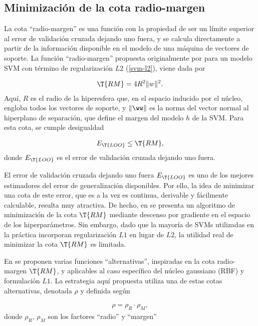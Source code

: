 
\subsection{Minimización de la cota radio-margen}
La cota ``radio-margen'' es una función con la propiedad de ser un
límite superior al error de validación cruzada dejando uno fuera, y se
calcula directamente a partir de la información disponible en el
modelo de una máquina de vectores de soporte.  La función
``radio-margen'' propuesta originalmente por \citeauthor{vapnik}
\cite{vapnik} para un modelo SVM  con término de regularización $L2$
(\autoref{svm-l2}), viene dada por %

\begin{align}
  \T{RM} = 4R^2 \|w\|^2.
\end{align}
Aquí, $R$ es el radio de la hiperesfera que, en el espacio inducido
por el núcleo, engloba todos los vectores de soporte, y $\|\ww\|$ es
la norma del vector normal al hiperplano de separación, que define el
margen del modelo $h$ de la SVM.  Para esta cota, se cumple
desigualdad

\begin{align}
  E_{\T{LOO}} \leq \T{RM},
\end{align}
donde $E_{\T{LOO}}$ es el error de validación cruzada dejando uno
fuera.

El error de validación cruzada dejando uno fuera $E_{\T{LOO}}$ es uno
de los mejores estimadores del error de generalización disponibles.
Por ello, la idea de minimizar una cota de este error, que es a la vez
es continua, derivable y fácilmente calculable, resulta muy atractiva.
De hecho, en \cite{chapelle} se presenta un algoritmo de minimización
de la cota $\T{RM}$ mediante descenso por gradiente en el espacio de
los hiperparámetros.  Sin embargo, dado que la mayoría de SVMs
utilizadas en la práctica incorporan regularización $L1$ en lugar de
$L2$, la utilidad real de minimizar la cota $\T{RM}$ es limitada.

En \cite{chung} se proponen varias funciones ``alternativas'',
inspiradas en la cota radio-margen $\T{RM}$, y aplicables al caso
específico del núcleo gaussiano (RBF) y formulación $L1$. La
estrategia aquí propuesta utiliza una de estas cotas
alternativas, denotada $\rho$ y definida según

\begin{align}
  \rho = \rho_R \cdot \rho_M,
\end{align}
donde $\rho_R$, $\rho_M$ son los factores ``radio'' y ``margen''

